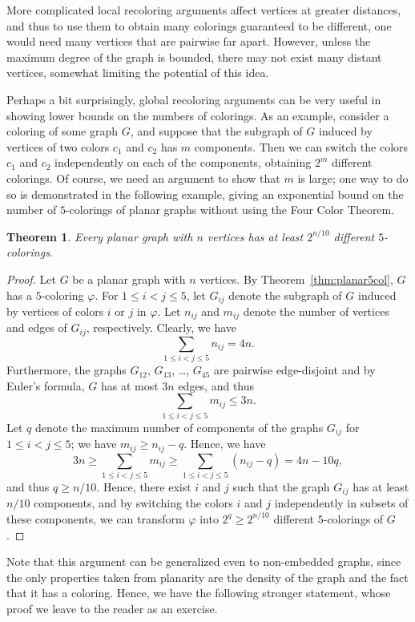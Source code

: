 \documentclass[12pt,twoside,openright,a4paper]{book}
\newtheorem{theorem}{Theorem}[chapter]
\begin{document}
More complicated local recoloring arguments affect vertices at greater distances, and thus to use them to obtain
many colorings guaranteed to be different, one would need many vertices that are pairwise far apart.  However,
unless the maximum degree of the graph is bounded, there may not exist many distant vertices, somewhat limiting the potential
of this idea.

Perhaps a bit surprisingly, global recoloring arguments can be very useful in showing lower bounds on the numbers of
colorings.  As an example, consider a coloring of some graph $G$, and suppose that the subgraph of $G$ induced by
vertices of two colors $c_1$ and $c_2$ has $m$ components.  Then we can switch the colors $c_1$ and $c_2$ independently
on each of the components, obtaining $2^m$ different colorings.  Of course, we need an argument to show that $m$ is large;
one way to do so is demonstrated in the following example, giving an exponential bound on the number of $5$-colorings
of planar graphs without using the Four Color Theorem.

\begin{theorem}\label{thm:num5col}
Every planar graph with $n$ vertices has at least $2^{n/10}$ different $5$-colorings.
\end{theorem}
\begin{proof}
Let $G$ be a planar graph with $n$ vertices.  By Theorem~\ref{thm:planar5col}, $G$ has
a $5$-coloring $\varphi$.  For $1\le i<j\le 5$, let $G_{ij}$ denote the subgraph of $G$
induced by vertices of colors $i$ or $j$ in $\varphi$.  Let $n_{ij}$ and $m_{ij}$
denote the number of vertices and edges of $G_{ij}$, respectively.
Clearly, we have
$$\sum_{1\le i<j\le 5} n_{ij}=4n.$$
Furthermore, the graphs $G_{12}$, $G_{13}$, \ldots, $G_{45}$ are pairwise edge-disjoint
and by Euler's formula, $G$ has at most $3n$ edges, and thus
$$\sum_{1\le i<j\le 5} m_{ij}\le 3n.$$
Let $q$ denote the maximum number of components of the graphs $G_{ij}$ for $1\le i<j\le 5$;
we have $m_{ij}\ge n_{ij}-q$.  Hence, we have
$$3n\ge \sum_{1\le i<j\le 5} m_{ij}\ge \sum_{1\le i<j\le 5} (n_{ij}-q)=4n-10q,$$
and thus $q\ge n/10$.  Hence, there exist $i$ and $j$ such that the graph $G_{ij}$
has at least $n/10$ components, and by switching the colors $i$ and $j$ independently
in subsets of these components, we can transform $\varphi$ into $2^q\ge 2^{n/10}$ different $5$-colorings of $G$.
\end{proof}

Note that this argument can be generalized even to non-embedded graphs, since the only
properties taken from planarity are the density of the graph and the fact that it has a coloring.
Hence, we have the following stronger statement, whose proof we leave to the reader as an
exercise.
\end{document}
